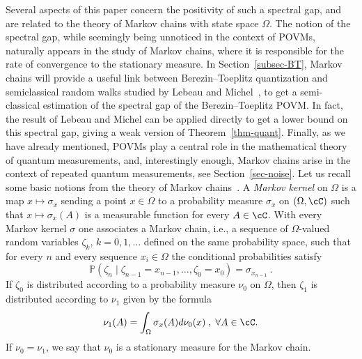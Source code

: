 Several aspects of this paper concern the positivity of such a spectral gap, and are related to the theory of Markov chains with state space $\Omega$. The notion of the spectral gap, while seemingly being unnoticed in the context of POVMs, naturally appears in the study of Markov chains, where it is responsible for the rate of convergence to the stationary measure. In Section~\ref{subsec-BT}, Markov chains will provide a useful link between Berezin--Toeplitz quantization and semiclassical random walks studied by Lebeau and Michel~\cite{LM}, to get a semi-classical estimation of the spectral gap of the Berezin--Toeplitz POVM. In fact, the result of Lebeau and Michel can be applied directly to get a lower bound on this spectral gap, giving a weak version of Theorem~\ref{thm-quant}. Finally, as we have already mentioned, POVMs play a central role in the mathematical theory of quantum measurements, and, interestingly enough, Markov chains arise in the context of repeated quantum measurements, see Section~\ref{sec-noise}. Let us recall some basic notions from the theory of Markov chains~\cite{Bak, Ru}. A \emph{Markov kernel} on $\Omega$ is a map $x \mapsto \sigma_x$ sending a point $x \in \Omega$ to a probability measure $\sigma_x$ on $(\Omega,\cC)$ such that $x \mapsto \sigma_x(A)$
is a measurable function for every $A \in \cC$. With every Markov kernel $\sigma$ one associates a Markov chain, i.e., a sequence of $\Omega$-valued random variables $\zeta_k$, $k = 0,1,\dots$ defined on the same probability space, such that for every $n$ and every sequence $x_i \in \Omega$ the conditional probabilities satisfy
\[
\mathbb{P}(\zeta_n \;|\; \zeta_{n-1}=x_{n-1},\dots, \zeta_0 = x_0) = \sigma_{x_{n-1}}\;.
\]
If $\zeta_0$ is distributed according to a probability measure $\nu_0$ on $\Omega$, then $\zeta_1$ is distributed according to $\nu_1$ given by the formula
\[
\nu_1(A) = \int_\Omega \sigma_x(A) d\nu_0(x)\;,\; \forall A \in \cC.
\]
If $\nu_0=\nu_1$, we say that $\nu_0$ is a stationary measure for the Markov chain.

